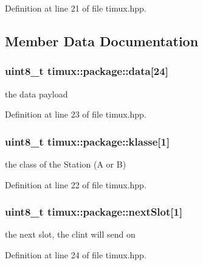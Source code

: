 Definition at line 21 of file timux.\+hpp.



\subsection{Member Data Documentation}
\hypertarget{structtimux_1_1package_a87c845817d21a505e3fe10d7c0488a25}{
\subsubsection[{data}]{\setlength{\rightskip}{0pt plus 5cm}uint8\+\_\+t timux\+::package\+::data\mbox{[}24\mbox{]}}}\label{structtimux_1_1package_a87c845817d21a505e3fe10d7c0488a25}


the data payload 



Definition at line 23 of file timux.\+hpp.

\hypertarget{structtimux_1_1package_a95fc0bef41718ca6be503b1a65ede4ed}{
\subsubsection[{klasse}]{\setlength{\rightskip}{0pt plus 5cm}uint8\+\_\+t timux\+::package\+::klasse\mbox{[}1\mbox{]}}}\label{structtimux_1_1package_a95fc0bef41718ca6be503b1a65ede4ed}


the class of the Station (A or B) 



Definition at line 22 of file timux.\+hpp.

\hypertarget{structtimux_1_1package_acc01431f30b66014c1c61975d84e519d}{
\subsubsection[{next\+Slot}]{\setlength{\rightskip}{0pt plus 5cm}uint8\+\_\+t timux\+::package\+::next\+Slot\mbox{[}1\mbox{]}}}\label{structtimux_1_1package_acc01431f30b66014c1c61975d84e519d}


the next slot, the clint will send on 



Definition at line 24 of file timux.\+hpp.

